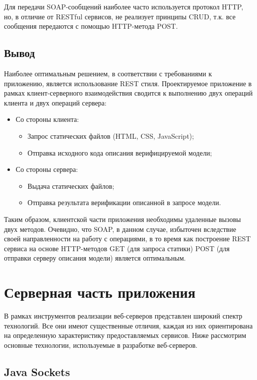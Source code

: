 Для передачи SOAP-сообщений наиболее часто используется протокол HTTP, но, в отличие от RESTful сервисов, не реализует принципы CRUD, т.к. все сообщения передаются с помощью HTTP-метода POST.

\subsection{Вывод}

Наиболее оптимальным решением, в соответствии с требованиями к приложению, является использование REST стиля. Проектируемое приложение в рамках клиент-серверного взаимодействия сводится к выполнению двух операций клиента и двух операций сервера:

\begin{itemize}
	\item Со стороны клиента:
	\begin{itemize}
		\item Запрос статических файлов (HTML, CSS, JavaScript);
		\item Отправка исходного кода описания верифицируемой модели;
	\end{itemize}
	\item Со стороны сервера:
	\begin{itemize}
	\item Выдача статических файлов;
	\item Отправка результата верификации описанной в запросе модели.
	\end{itemize}
\end{itemize}

Таким образом, клиентской части приложения необходимы удаленные вызовы двух методов. Очевидно, что SOAP, в данном случае, избыточен вследствие своей направленности на работу с операциями, в то время как построение REST сервиса на основе HTTP-методов GET (для запроса статики) POST (для отправки серверу описания модели) является оптимальным.

\section{Серверная часть приложения}

В рамках инструментов реализации веб-серверов представлен широкий спектр технологий. Все они имеют существенные отличия, каждая из них ориентирована на определенную характеристику предоставляемых сервисов. Ниже рассмотрим основные технологии, используемые в разработке веб-серверов. 

\subsection{Java Sockets}

